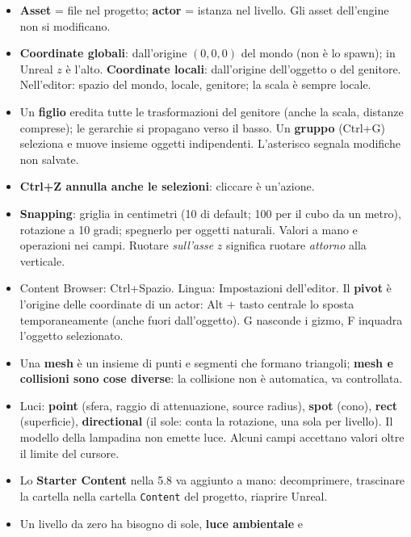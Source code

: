 \begin{itemize}
        \textbf{spline} (strade e cavi: copie di una mesh lungo una curva,
        per evitare lo stretch). Si sceglie lo strumento più veloce per lo
        scopo.
  \item \textbf{Asset} = file nel progetto; \textbf{actor} = istanza nel
        livello. Gli asset dell'engine non si modificano.
  \item \textbf{Coordinate globali}: dall'origine $(0,0,0)$ del mondo (non è lo
        spawn); in Unreal $z$ è l'alto. \textbf{Coordinate locali}: dall'origine
        dell'oggetto o del genitore. Nell'editor: spazio del mondo, locale,
        genitore; la scala è sempre locale.
  \item Un \textbf{figlio} eredita tutte le trasformazioni del genitore
        (anche la scala, distanze comprese); le gerarchie si propagano verso il
        basso. Un \textbf{gruppo} (Ctrl+G) seleziona e muove insieme oggetti
        indipendenti. L'asterisco segnala modifiche non salvate.
  \item \textbf{Ctrl+Z annulla anche le selezioni}: cliccare è un'azione.
  \item \textbf{Snapping}: griglia in centimetri (10 di default; 100 per il
        cubo da un metro), rotazione a 10 gradi; spegnerlo per oggetti
        naturali. Valori a mano e operazioni nei campi. Ruotare
        \emph{sull'asse} $z$ significa ruotare \emph{attorno} alla verticale.
  \item Content Browser: Ctrl+Spazio. Lingua: Impostazioni dell'editor. Il
        \textbf{pivot} è l'origine delle coordinate di un actor: Alt + tasto
        centrale lo sposta temporaneamente (anche fuori dall'oggetto). G
        nasconde i gizmo, F inquadra l'oggetto selezionato.
  \item Una \textbf{mesh} è un insieme di punti e segmenti che formano
        triangoli; \textbf{mesh e collisioni sono cose diverse}: la collisione
        non è automatica, va controllata.
  \item Luci: \textbf{point} (sfera, raggio di attenuazione, source radius),
        \textbf{spot} (cono), \textbf{rect} (superficie),
        \textbf{directional} (il sole: conta la rotazione, una sola per
        livello). Il modello della lampadina non emette luce. Alcuni campi
        accettano valori oltre il limite del cursore.
  \item Lo \textbf{Starter Content} nella 5.8 va aggiunto a mano: decomprimere,
        trascinare la cartella nella cartella \texttt{Content} del progetto,
        riaprire Unreal.
  \item Un livello da zero ha bisogno di sole, \textbf{luce ambientale} e

\end{itemize}
